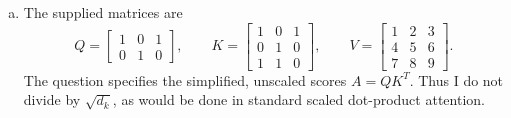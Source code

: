 \documentclass[12pt]{article}
\begin{document}
\begin{enumerate}
\begin{enumerate}[a)]
        In cross-attention, the queries come from one sequence and the keys
        and values come from another. For example, in an encoder--decoder
        transformer, the decoder representations $Y$ provide $Q=YW_Q$, while
        the encoder outputs $X$ provide $K=XW_K$ and $V=XW_V$. Each decoder
        position can therefore attend to the input sequence when producing
        its output. The sequences can have different lengths. Both mechanisms
        compute attention weights from query--key comparisons and use those
        weights to combine values; the difference is where the queries,
        keys, and values come from.

        \item The supplied matrices are
        \[
            Q=\begin{bmatrix}1&0&1\\0&1&0\end{bmatrix},\qquad
            K=\begin{bmatrix}1&0&1\\0&1&0\\1&1&0\end{bmatrix},\qquad
            V=\begin{bmatrix}1&2&3\\4&5&6\\7&8&9\end{bmatrix}.
        \]
        The question specifies the simplified, unscaled scores $A=QK^T$.
        Thus I do not divide by $\sqrt{d_k}$, as would be done in standard
        scaled dot-product attention.


\end{enumerate}
\end{enumerate}
\end{document}
